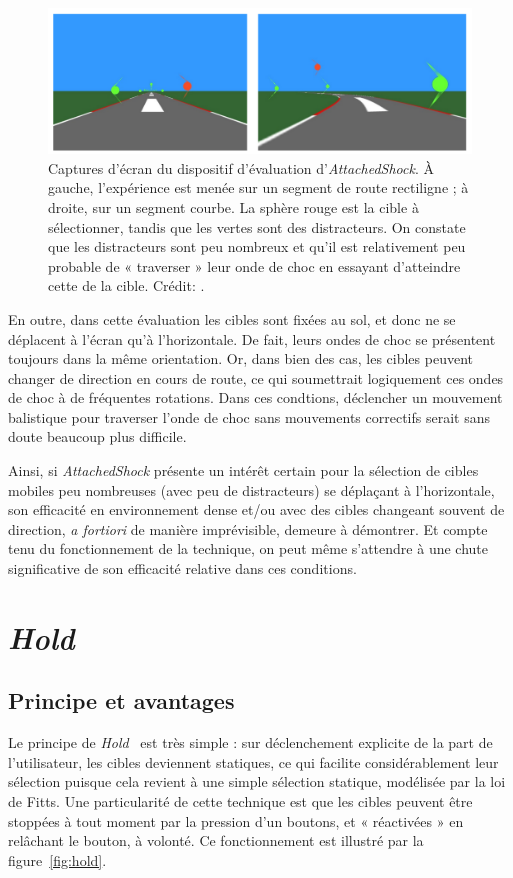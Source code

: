 	\begin{figure}[ht]
		\centering
		\includegraphics[width=\textwidth]{figures/ch2/asDensity}
		\caption[\emph{AttachedShock}, densité de cibles]{Captures d'écran du dispositif d'évaluation d'\emph{AttachedShock}. À gauche, l'expérience est menée sur un segment de route rectiligne ; à droite, sur un segment courbe. La sphère rouge est la cible à sélectionner, tandis que les vertes sont des distracteurs. On constate que les distracteurs sont peu nombreux et qu'il est relativement peu probable de « traverser » leur onde de choc en essayant d'atteindre cette de la cible. Crédit: \cite{you2012attachedshock}.}
		\label{fig:asDensity}
	\end{figure}
	
	En outre, dans cette évaluation les cibles sont fixées au sol, et donc ne se déplacent à l'écran qu'à l'horizontale. De fait, leurs ondes de choc se présentent toujours dans la même orientation. Or, dans bien des cas, les cibles peuvent changer de direction en cours de route, ce qui soumettrait logiquement ces ondes de choc à de fréquentes rotations. Dans ces condtions, déclencher un mouvement balistique pour traverser l'onde de choc sans mouvements correctifs serait sans doute beaucoup plus difficile.
	
	Ainsi, si \emph{AttachedShock} présente un intérêt certain pour la sélection de cibles mobiles peu nombreuses (avec peu de distracteurs) se déplaçant à l'horizontale, son efficacité en environnement dense et/ou avec des cibles changeant souvent de direction, \emph{a fortiori} de manière imprévisible, demeure à démontrer. Et compte tenu du fonctionnement de la technique, on peut même s'attendre à une chute significative de son efficacité relative dans ces conditions.

\section{\emph{Hold}}
	\subsection{Principe et avantages}
	Le principe de \emph{Hold}~\cite{hajri2011moving} est très simple : sur déclenchement explicite de la part de l'utilisateur, les cibles deviennent statiques, ce qui facilite considérablement leur sélection puisque cela revient à une simple sélection statique, modélisée par la loi de Fitts. Une particularité de cette technique est que les cibles peuvent être stoppées à tout moment par la pression d'un boutons, et « réactivées » en relâchant le bouton, à volonté. Ce fonctionnement est illustré par la figure~\ref{fig:hold}.
	
